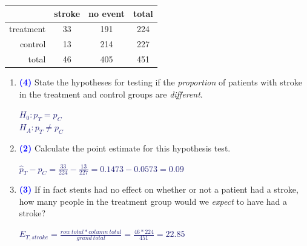 \documentclass[11pt]{article}
\newcommand{\soln}[1]{\textcolor{MidnightBlue}{\textit{#1}}}	%
\newcommand{\pts}[1]{ \textbf{{\footnotesize \textcolor{blue}{(#1)}}} }	%
\begin{document}
\begin{enumerate}
\begin{center}
\begin{tabular}{r c c | c }
  \hline
 			& stroke		 & no event		& total \\ 
  \hline
treatment	 	& 33 			& 191 			& 224 \\ 
control	 	& 13			& 214 			& 227 \\ 
   \hline
total			& 46			& 405			& 451 \\
   \hline
\end{tabular}
\end{center}

\vspace{0.25cm}

\begin{enumerate}

\item \pts{4} State the hypotheses for testing if the \emph{proportion} of patients with stroke in the treatment and control groups are \emph{different}.

\soln{$H_0: p_T = p_C$ \\
$H_A: p_T \ne p_C$
}

\item \pts{2} Calculate the point estimate for this hypothesis test.

\soln{$\hat{p}_T - \hat{p}_C = \frac{33}{224} - \frac{13}{227} = 0.1473 - 0.0573 = 0.09$}

\item \pts{3} If in fact stents had no effect on whether or not a patient had a stroke, how many people in the treatment group would we \emph{expect} to have had a stroke?

\soln{$E_{T,stroke} = \frac{row~total * column~total}{grand~total} = \frac{46 * 224}{451} = 22.85$}
$\:$


\end{enumerate}
\end{enumerate}
\end{document}
